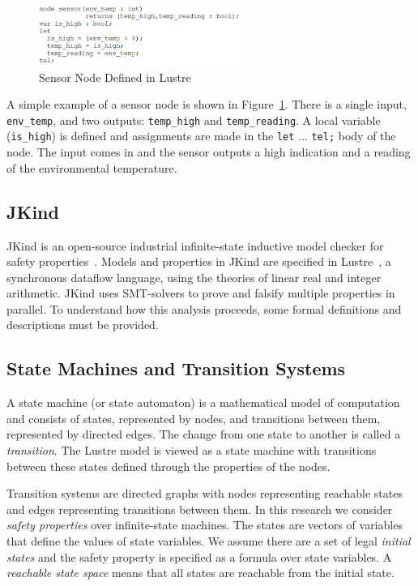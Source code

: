 \begin{figure}[h]
	\begin{center}
		\includegraphics[width=0.6\textwidth]{images/lustreExample.PNG}
	\end{center}
	\caption{Sensor Node Defined in Lustre}
	\label{fig:lustreExample}
\end{figure}

A simple example of a sensor node is shown in Figure~\ref{fig:lustreExample}. There is a single input, \texttt{env\_temp}, and two outputs: \texttt{temp\_high} and \texttt{temp\_reading}. A local variable (\texttt{is\_high}) is defined and assignments are made in the \texttt{let} ... \texttt{tel;} body of the node. The input comes in and the sensor outputs a high indication and a reading of the environmental temperature. 

\subsection{JKind}
JKind is an open-source industrial infinite-state inductive model checker for safety properties~\cite{2017arXiv171201222G}. Models and properties in JKind are specified in Lustre~\cite{Halbwachs91:IEEE}, a synchronous dataflow language, using the theories of linear real and integer arithmetic. JKind uses SMT-solvers to prove and falsify multiple properties in parallel. To understand how this analysis proceeds, some formal definitions and descriptions must be provided. 

\subsection{State Machines and Transition Systems}
\label{subsec:trans}
A state machine (or state automaton) is a mathematical model of computation and consists of states, represented by nodes, and transitions between them, represented by directed edges. The change from one state to another is called a {\em transition}. The Lustre model is viewed as a state machine with transitions between these states defined through the properties of the nodes. 

Transition systems are directed graphs with nodes representing reachable states and edges representing transitions between them. In this research we consider \emph{safety properties} over infinite-state machines. The states are vectors of variables that define the values of state variables. We assume there are a set of legal \emph{initial states} and the safety property is specified as a formula over state variables. A \emph{reachable state space} means that all states are reachable from the initial state. 

